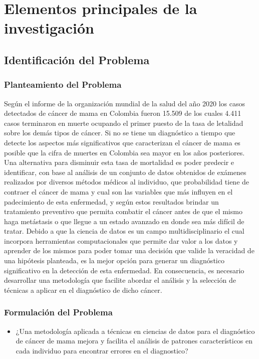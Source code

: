 \chapter{Elementos principales de la investigación}
\section{Identificación del Problema}
\subsection{Planteamiento del Problema}
Según el informe de la organización mundial de la salud del año 2020 los casos detectados de cáncer de mama en Colombia fueron 15.509 de los cuales 4.411 casos terminaron en muerte ocupando el primer puesto de la tasa de letalidad sobre los demás tipos de cáncer\cite{InternationalAgencyforResearchonCancer2020}. Si no se tiene un diagnóstico a tiempo que detecte los aspectos más significativos que caracterizan el cáncer de mama es posible que la cifra de muertes en Colombia sea mayor en los años posteriores. Una alternativa para disminuir esta tasa de mortalidad es poder predecir e identificar, con base al análisis de un conjunto de datos obtenidos de exámenes realizados por diversos métodos médicos al individuo, que probabilidad tiene de contraer el cáncer de mama y cual son las variables que más influyen en el padecimiento de esta enfermedad,  y según estos resultados brindar un tratamiento preventivo que permita combatir el cáncer antes de que el mismo haga metástasis o que llegue a un estado avanzado en donde sea más difícil de tratar. Debido a que la ciencia de datos es un campo multidisciplinario el cual incorpora herramientas computacionales que permite dar valor a los datos y aprender de los mismos para poder tomar una decisión que valide la veracidad de una hipótesis planteada, es la mejor opción para generar un diagnóstico significativo en la detección de esta enfermedad. En consecuencia, es necesario desarrollar una metodología que facilite abordar el análisis y la selección de técnicas a aplicar en el diagnóstico de dicho cáncer.

\subsection{Formulación del Problema}

\begin{itemize}
	\item ¿Una metodología aplicada a técnicas en ciencias de datos para el diagnóstico de cáncer de mama mejora y facilita el análisis de patrones característicos en cada individuo para encontrar errores en el diagnostico? 
\end{itemize}

